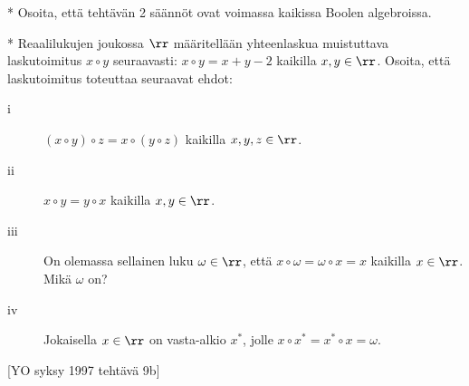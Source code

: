 \begin{tehtavasivu}
\begin{tehtava}
	* Osoita, että tehtävän 2 säännöt ovat voimassa kaikissa Boolen algebroissa.
\end{tehtava}

\begin{tehtava}
	* Reaalilukujen joukossa $\rr$ määritellään yhteenlaskua muistuttava laskutoimitus $x \circ y$ seuraavasti: $x \circ y = x + y - 2$ kaikilla $x, y \in \rr$. Osoita, että laskutoimitus toteuttaa seuraavat ehdot: 
	\begin{description}
	\item[i]
	$(x \circ y) \circ z = x \circ (y \circ z)$ kaikilla $x, y, z \in \rr$. 
	\item[ii]
	$x \circ y = y \circ x$ kaikilla $x, y \in \rr$. 
	\item[iii]
	On olemassa sellainen luku $\omega \in \rr$, että $x \circ \omega = \omega \circ x = x$ kaikilla $x \in \rr$. Mikä $\omega$ on? 
	\item[iv]
	Jokaisella $x \in \rr$ on vasta-alkio $x^*$, jolle $x \circ x^* = x^* \circ x = \omega$. 
	\end{description}
	[YO syksy 1997 tehtävä 9b]
\end{tehtava}

\end{tehtavasivu}
